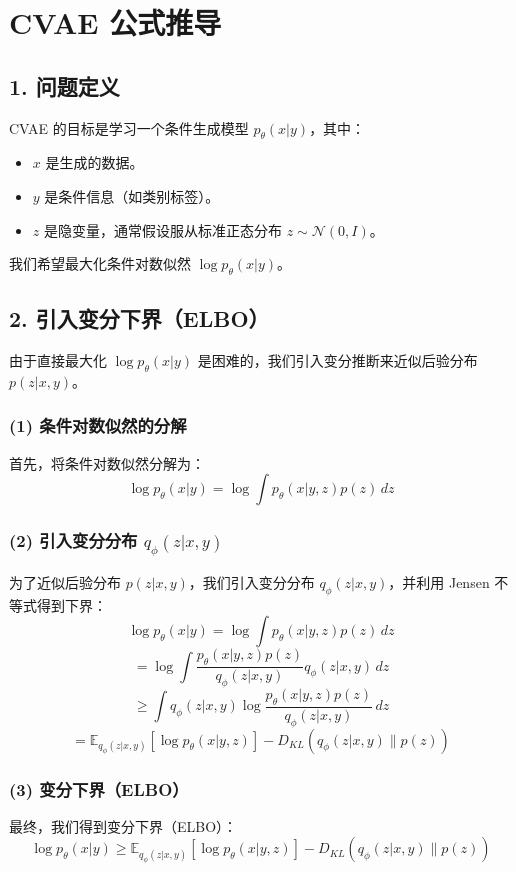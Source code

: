 \documentclass{article}
\begin{document}
\section*{CVAE 公式推导}

\subsection*{1. 问题定义}
CVAE 的目标是学习一个条件生成模型 \( p_\theta(x|y) \)，其中：
\begin{itemize}
  \item \( x \) 是生成的数据。
  \item \( y \) 是条件信息（如类别标签）。
  \item \( z \) 是隐变量，通常假设服从标准正态分布 \( z \sim \mathcal{N}(0, I) \)。
\end{itemize}

我们希望最大化条件对数似然 \( \log p_\theta(x|y) \)。

\subsection*{2. 引入变分下界（ELBO）}
由于直接最大化 \( \log p_\theta(x|y) \) 是困难的，我们引入变分推断来近似后验分布 \( p(z|x, y) \)。

\subsubsection*{(1) 条件对数似然的分解}
首先，将条件对数似然分解为：
\[
  \log p_\theta(x|y) = \log \int p_\theta(x|y, z) p(z) \, dz
\]

\subsubsection*{(2) 引入变分分布 \( q_\phi(z|x, y) \)}
为了近似后验分布 \( p(z|x, y) \)，我们引入变分分布 \( q_\phi(z|x, y) \)，并利用 Jensen 不等式得到下界：
\[
  \log p_\theta(x|y) = \log \int p_\theta(x|y, z) p(z) \, dz
\]
\[
  = \log \int \frac{p_\theta(x|y, z) p(z)}{q_\phi(z|x, y)} q_\phi(z|x, y) \, dz
\]
\[
  \geq \int q_\phi(z|x, y) \log \frac{p_\theta(x|y, z) p(z)}{q_\phi(z|x, y)} \, dz
\]
\[
  = \mathbb{E}_{q_\phi(z|x, y)} \left[ \log p_\theta(x|y, z) \right] - D_{KL}(q_\phi(z|x, y) \| p(z))
\]

\subsubsection*{(3) 变分下界（ELBO）}
最终，我们得到变分下界（ELBO）：
\[
  \log p_\theta(x|y) \geq \mathbb{E}_{q_\phi(z|x, y)} \left[ \log p_\theta(x|y, z) \right] - D_{KL}(q_\phi(z|x, y) \| p(z))
\]
\end{document}
